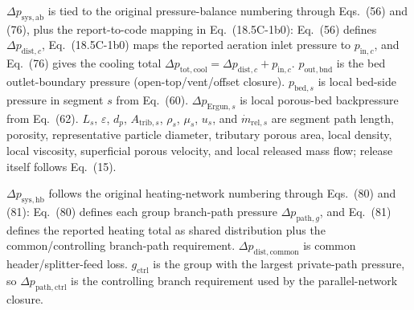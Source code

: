 \documentclass[11pt]{article}
\begin{document}
\(\Delta p_{\mathrm{sys},\mathrm{ab}}\) is tied to the original pressure-balance numbering through Eqs.~(56) and (76), plus the report-to-code mapping in Eq.~(18.5C-1b0): Eq.~(56) defines \(\Delta p_{\mathrm{dist},c}\), Eq.~(18.5C-1b0) maps the reported aeration inlet pressure to \(p_{\mathrm{in},c}\), and Eq.~(76) gives the cooling total \(\Delta p_{\mathrm{tot,cool}}=\Delta p_{\mathrm{dist},c}+p_{\mathrm{in},c}\). \(p_{\mathrm{out,bnd}}\) is the bed outlet-boundary pressure (open-top/vent/offset closure). \(p_{\mathrm{bed},s}\) is local bed-side pressure in segment \(s\) from Eq.~(60). \(\Delta p_{\mathrm{Ergun},s}\) is local porous-bed backpressure from Eq.~(62). \(L_s\), \(\varepsilon\), \(d_p\), \(A_{\mathrm{trib},s}\), \(\rho_s\), \(\mu_s\), \(u_s\), and \(\dot m_{\mathrm{rel},s}\) are segment path length, porosity, representative particle diameter, tributary porous area, local density, local viscosity, superficial porous velocity, and local released mass flow; release itself follows Eq.~(15).

\(\Delta p_{\mathrm{sys},\mathrm{hb}}\) follows the original heating-network numbering through Eqs.~(80) and (81): Eq.~(80) defines each group branch-path pressure \(\Delta p_{\mathrm{path},g}\), and Eq.~(81) defines the reported heating total as shared distribution plus the common/controlling branch-path requirement. \(\Delta p_{\mathrm{dist,common}}\) is common header/splitter-feed loss. \(g_{\mathrm{ctrl}}\) is the group with the largest private-path pressure, so \(\Delta p_{\mathrm{path,ctrl}}\) is the controlling branch requirement used by the parallel-network closure.
\end{document}
